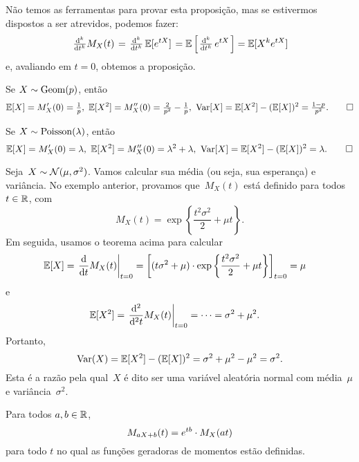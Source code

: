 Não temos as ferramentas para provar esta proposição, mas se estivermos dispostos a ser atrevidos, podemos fazer:
\[
\left. \tfrac{\mathrm{d}^{k}}{\mathrm{d} t^{k}}M_{X}(t)\right.
=
\left. \tfrac{\mathrm{d}^{k}}{\mathrm{d} t^{k}} \, \mathbb{E} [e^{tX}] \right.
=
\mathbb{E} \left[ \left. \tfrac{\mathrm{d}^{k}}{\mathrm{d} t^{k}} \, e^{tX} \right.
\right]
=
\mathbb{E} [X^{k}e^{tX}]
\]
e, avaliando em $ t=0 $, obtemos a proposição.

\begin{example}
[Geométrica]
Se $X\sim \mathrm{Geom}(p)$, então
\begin{equation*}
\mathbb{E} [X] = M_X'(0) = \tfrac{1}{p}
,
\
\mathbb{E} [X^2] = M_X''(0) = \tfrac{2}{p^2} - \tfrac{1}{p}
,
\
\mathrm{Var} [X] = \mathbb{E} [X^2] - (\mathbb{E} [X])^2 = \tfrac{1-p}{p^{2}}
.
\qedhere
\end{equation*}
\end{example}

\begin{example}
[Poisson]
Se $X\sim \mathrm{Poisson}(\lambda )$, então
\begin{equation*}
\mathbb{E} [X] = M_X'(0) = \lambda
,
\
\mathbb{E} [X^2] = M_X''(0) = \lambda^2 + \lambda
,
\
\mathrm{Var} [X] = \mathbb{E} [X^2] - (\mathbb{E} [X])^2 = \lambda
.
\qedhere
\end{equation*}
\end{example}

\begin{example}
[Normal]
Seja~$X \sim \mathcal{N} (\mu,\sigma^2)$. Vamos calcular sua média (ou seja, sua esperança) e variância.
No exemplo anterior, provamos que~$M_X(t)$ está definido para todos~$t \in \mathbb{R}$, com
\[M_X(t) = \exp\left\{\frac{t^2\sigma^2}{2} + \mu t\right\}.\]
Em seguida, usamos o teorema acima para calcular
\begin{align*}
 \mathbb{E}[X] &=\left. \frac{\mathrm{d} }{\mathrm{d} t}M_X(t)\right\vert_{t=0} = \left[ (t\sigma^2 + \mu)\cdot \exp\left\{\frac{t^2 \sigma^2}{2}+\mu t\right\}\right]_{t=0} = \mu
 \end{align*}
e
\begin{align*}
 \mathbb{E}[X^2] &=\left. \frac{\mathrm{d} ^2}{\mathrm{d} ^2t}M_X(t)\right\vert_{t=0}
= \cdots
=
\sigma^2 + \mu^2.
 \end{align*}
Portanto,
\[\mathrm{Var} (X) = \mathbb{E}[X^2] - (\mathbb{E}[X])^2 = \sigma^2 + \mu^2 - \mu^2 = \sigma^2.\]
Esta é a razão pela qual~$X$ é dito ser uma variável aleatória normal com média~$\mu$ e variância~$\sigma^2$.
\end{example}

\begin{proposition}
Para todos $a, b \in \mathbb{R}$,
\[
M_{aX+b}(t) = e ^{tb}\cdot M_X(at)
\]
para todo $ t $ no qual as funções geradoras de momentos estão definidas.
\end{proposition}


